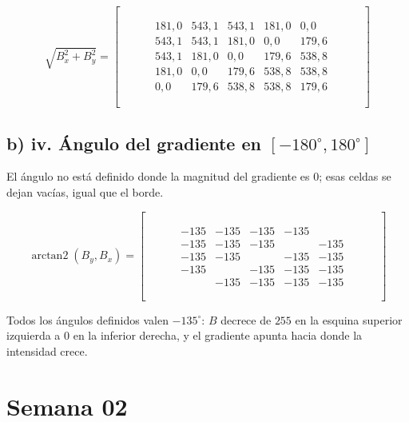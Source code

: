 \documentclass[12pt, a4paper]{article}
\newcommand{\vacia}{\phantom{0000}}
\begin{document}
\[
\sqrt{B_x^2 + B_y^2} =
\begin{bmatrix}
\vacia & \vacia & \vacia & \vacia & \vacia & \vacia & \vacia \\
\vacia & 181{,}0 & 543{,}1 & 543{,}1 & 181{,}0 & 0{,}0 & \vacia \\
\vacia & 543{,}1 & 543{,}1 & 181{,}0 & 0{,}0 & 179{,}6 & \vacia \\
\vacia & 543{,}1 & 181{,}0 & 0{,}0 & 179{,}6 & 538{,}8 & \vacia \\
\vacia & 181{,}0 & 0{,}0 & 179{,}6 & 538{,}8 & 538{,}8 & \vacia \\
\vacia & 0{,}0 & 179{,}6 & 538{,}8 & 538{,}8 & 179{,}6 & \vacia \\
\vacia & \vacia & \vacia & \vacia & \vacia & \vacia & \vacia
\end{bmatrix}
\]

\subsection{b) iv. Ángulo del gradiente en $[-180^\circ, 180^\circ]$}

El ángulo no está definido donde la magnitud del gradiente es $0$; esas celdas se dejan vacías, igual que el borde.

\[
\operatorname{arctan2}(B_y, B_x) =
\begin{bmatrix}
\vacia & \vacia & \vacia & \vacia & \vacia & \vacia & \vacia \\
\vacia & -135 & -135 & -135 & -135 & \vacia & \vacia \\
\vacia & -135 & -135 & -135 & \vacia & -135 & \vacia \\
\vacia & -135 & -135 & \vacia & -135 & -135 & \vacia \\
\vacia & -135 & \vacia & -135 & -135 & -135 & \vacia \\
\vacia & \vacia & -135 & -135 & -135 & -135 & \vacia \\
\vacia & \vacia & \vacia & \vacia & \vacia & \vacia & \vacia
\end{bmatrix}
\]

Todos los ángulos definidos valen $-135^\circ$: $B$ decrece de $255$ en la esquina superior izquierda a $0$ en la inferior derecha, y el gradiente apunta hacia donde la intensidad crece.

\section{Semana 02}
\end{document}
